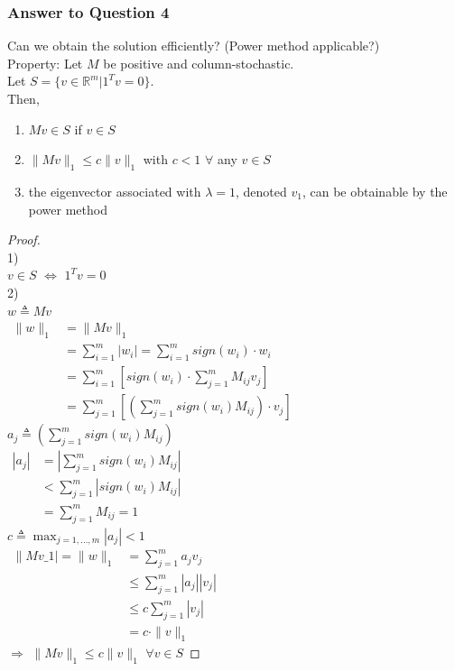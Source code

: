 \begin{multicols}{2}
\subsubsection{Answer to Question 4}
Can we obtain the solution efficiently? (Power method applicable?) \\
Property:
Let $M$ be positive and column-stochastic. \\
Let $S=\{v\in \mathbb{R}^m | 1^Tv=0 \}$. \\
Then,
\begin{enumerate}
    \item $Mv\in S$ if $v\in S$
    \item $\|Mv\|_1 \leq c\|v\|_1$ with $c<1$ $\forall$ any $v\in S$
    \item the eigenvector associated with $\lambda=1$, denoted $v_1$, can be obtainable by the power method
\end{enumerate}
\begin{proof} \\
    1) \\
    $v\in S$ $\Longleftrightarrow$ $1^Tv=0$ \\
    2) \\
    $w\triangleq Mv$ \\
    $\begin{array}{ll}
        \|w\|_1 &= \|Mv\|_1 \\
                &= \sum_{i=1}^m |w_i| = \sum_{i=1}^m sign(w_i)\cdot w_i \\
                &= \sum_{i=1}^m \left[ sign(w_i)\cdot \sum_{j=1}^m M_{ij}v_j \right] \\
                &= \sum_{j=1}^m \left[ \left( \sum_{j=1}^m sign(w_i)M_{ij} \right) \cdot v_j \right]
    \end{array}$\\
    $a_j\triangleq \left( \sum_{j=1}^m sign(w_i)M_{ij} \right)$\\
    $\begin{array}{ll}
        |a_j|   &= \left| \sum_{j=1}^m sign(w_i)M_{ij} \right| \\
                &< \sum_{j=1}^m \left| sign(w_i)M_{ij} \right| \\
                &= \sum_{j=1}^m M_{ij} = 1
    \end{array}$\\
    $c\triangleq \max_{j=1,...,m} |a_j| < 1$\\
    $\begin{array}{ll}
        \|Mv\_1| = \|w\|_1  &= \sum_{j=1}^m a_jv_j \\
                            &\leq \sum_{j=1}^m |a_j||v_j| \\
                            &\leq c \sum_{j=1}^m |v_j| \\
                            &= c\cdot \|v\|_1
    \end{array}$\\
    $\Longrightarrow$ $\|Mv\|_1 \leq c\|v\|_1 $ $\forall v\in S$
\end{proof}
\newpage
\end{multicols}